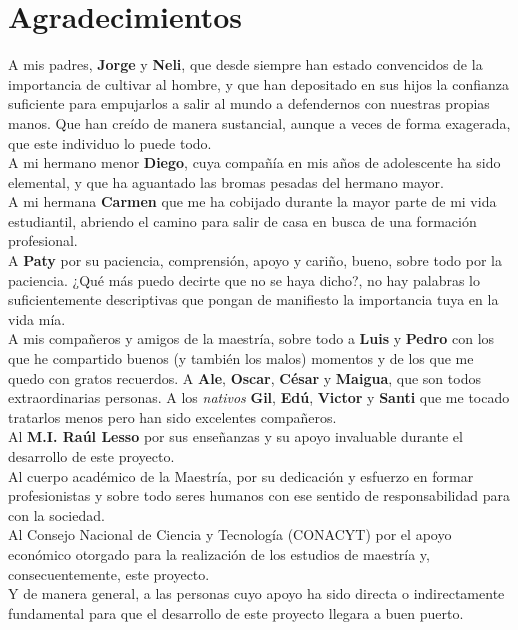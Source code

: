 \chapter*{Agradecimientos}


A mis padres, \textbf{Jorge} y \textbf{Neli}, que desde siempre han estado convencidos de la importancia de cultivar al hombre, y que 
han depositado en sus hijos la confianza suficiente para empujarlos a salir al mundo a 
defendernos con nuestras propias manos. Que han creído de manera sustancial, aunque a veces de forma 
exagerada, que este individuo lo puede todo.\\

A mi hermano menor \textbf{Diego}, cuya compañía en mis años de adolescente ha sido elemental, y que ha 
aguantado las bromas pesadas del hermano mayor.\\

A mi hermana \textbf{Carmen} que me ha cobijado durante la mayor parte de mi vida estudiantil, 
abriendo el camino para salir de casa en busca de una formación profesional.\\

A \textbf{Paty} por su paciencia, comprensión, apoyo y cariño, bueno, sobre todo por la paciencia. ¿Qué más 
puedo decirte que no se haya dicho?, no hay palabras lo suficientemente descriptivas que pongan de manifiesto 
la importancia tuya en la vida mía. \\

A mis compañeros y amigos de la maestría, sobre todo a  \textbf{Luis} y \textbf{Pedro} con los que he compartido buenos (y también los malos) 
momentos y de los que me quedo con gratos recuerdos. A \textbf{Ale}, \textbf{Oscar}, \textbf{César} y \textbf{Maigua}, que son todos extraordinarias personas. 
A los \textit{nativos} \textbf{Gil}, \textbf{Edú}, \textbf{Victor} y \textbf{Santi} que me tocado tratarlos menos pero han sido excelentes compañeros. \\

Al \textbf{M.I. Raúl Lesso} por sus enseñanzas y su apoyo invaluable durante el desarrollo de este proyecto.\\

Al cuerpo académico de la Maestría, por su dedicación y esfuerzo en formar profesionistas y sobre todo 
seres humanos con ese sentido de responsabilidad para con la sociedad.\\

Al Consejo Nacional de Ciencia y Tecnología (CONACYT) por el apoyo económico otorgado para la realización de los estudios 
de maestría y, consecuentemente, este proyecto.\\

Y de manera general, a las personas cuyo apoyo ha sido directa o indirectamente fundamental para 
que el desarrollo de este proyecto llegara a buen puerto.
